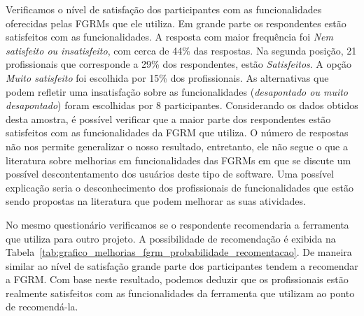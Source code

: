 
Verificamos o nível de satisfação dos participantes com as funcionalidades
oferecidas pelas FGRMs que ele utiliza. Em grande parte os respondentes estão
satisfeitos com as funcionalidades. A resposta com maior frequência foi
\textit{Nem satisfeito ou insatisfeito}, com cerca de 44\% das respostas. Na
segunda posição, 21 profissionais que corresponde a 29\% dos respondentes, estão
\textit{Satisfeitos}. A opção \textit{Muito satisfeito} foi escolhida por 15\%
dos profissionais. As alternativas que podem refletir uma insatisfação sobre as
funcionalidades (\textit{desapontado ou muito desapontado}) foram escolhidas por
8 participantes. Considerando os dados obtidos desta amostra, é possível
verificar que a maior parte dos respondentes estão satisfeitos com as
funcionalidades da FGRM que utiliza. O número de respostas não nos permite
generalizar o nosso resultado, entretanto, ele não segue o que a literatura
sobre melhorias em funcionalidades das FGRMs em que se discute um possível
descontentamento dos usuários deste tipo de software. Uma possível explicação
seria o desconhecimento dos profissionais de funcionalidades que estão sendo
propostas na literatura que podem melhorar as suas atividades.


No mesmo questionário verificamos se o respondente recomendaria a ferramenta que
utiliza para outro projeto. A possibilidade de recomendação é exibida na
Tabela~\ref{tab:grafico_melhorias_fgrm_probabilidade_recomentacao}. De maneira
similar ao nível de satisfação grande parte dos participantes tendem a
recomendar a FGRM\@. Com base neste resultado, podemos deduzir que os
profissionais estão realmente satisfeitos com as funcionalidades da ferramenta
que utilizam ao ponto de recomendá-la.


